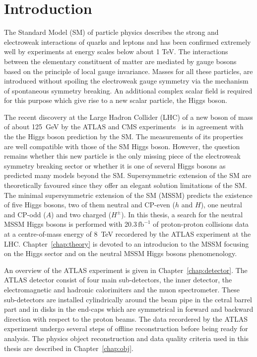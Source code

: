 \chapter{Introduction}

 
The Standard Model (SM) of particle physics  describes the strong and electroweak interactions
of quarks and leptons and has been confirmed extremely well by experiments at energy scales below about 1 TeV. 
The interactions between the elementary constituent of matter are mediated by gauge bosons 
based on the principle of local gauge invariance.
Masses for all these  particles, are introduced without spoiling the electroweak gauge symmetry 
via the mechanism of spontaneous symmetry breaking. An additional complex scalar field is required for this
purpose which give rise to a new scalar particle, the Higgs boson.

The recent discovery at the  Large Hadron Collider (LHC) of a new boson of mass
of about 125~GeV by the ATLAS and CMS experiments~\cite{AHiggsO,CHiggsO} is in agreement with the 
the Higgs boson prediction by the SM. The measurements  of its properties~\cite{ASpin0,ACouplings,CFermions,CWidth}
are well compatible with those of the SM Higgs boson. However, the question remains 
whether this new particle is the only missing piece of the electroweak symmetry breaking
sector or whether it is one of several Higgs bosons as predicted many models beyond the SM.
Supersymmetric extension of the SM are theoretically favoured since they
offer an elegant solution limitations of the SM.
The minimal supersymmetric extension of the SM (MSSM) predicts the existence
of five Higgs bosons, two of them neutral and CP-even ($h$ and $H$), one neutral and CP-odd ($A$) and two charged ($H^{\pm}$).
In this thesis, a search for the neutral MSSM Higgs bosons is performed with 20.3$\,\text{fb}^{-1}$ of
proton-proton collisions data at a centre-of-mass energy of 8~TeV recordered by the ATLAS experiment at the LHC. 
Chapter~\ref{chap:theory} is devoted to an  introducion to the MSSM focusing  on the Higgs sector
and on the neutral MSSM Higgs bosons phenomenology.

An overview of the ATLAS experiment is given in Chapter~\ref{chap:detector}. 
The ATLAS detector consist of four main sub-detectors, the inner detector,
the electromagnetic and hadronic calorimiters and the muon spectrometer. These sub-detectors are installed 
cylindrically around the beam pipe in the cetral barrel part and in disks in the end-caps which are symmetrical in
forward and backward direction with respect to the proton beams.
The data recordered by the ATLAS experiment undergo several steps of offline reconstruction 
before being ready for analysis. The physics object reconstruction and data quality criteria used in this thesis are described in 
Chapter~\ref{chap:obj}.

